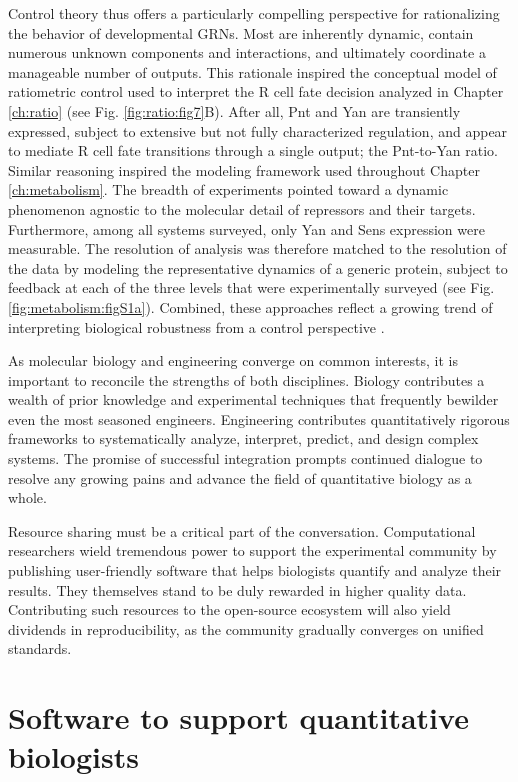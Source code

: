 Control theory thus offers a particularly compelling perspective for rationalizing the behavior of developmental GRNs. Most are inherently dynamic, contain numerous unknown components and interactions, and ultimately coordinate a manageable number of outputs. This rationale inspired the conceptual model of ratiometric control used to interpret the R cell fate decision analyzed in Chapter \ref{ch:ratio} (see Fig. \ref{fig:ratio:fig7}B). After all, Pnt and Yan are transiently expressed, subject to extensive but not fully characterized regulation, and appear to mediate R cell fate transitions through a single output; the Pnt-to-Yan ratio. Similar reasoning inspired the modeling framework used throughout Chapter \ref{ch:metabolism}. The breadth of experiments pointed toward a dynamic phenomenon agnostic to the molecular detail of repressors and their targets. Furthermore, among all systems surveyed, only Yan and Sens expression were measurable. The resolution of analysis was therefore matched to the resolution of the data by modeling the representative dynamics of a generic protein, subject to feedback at each of the three levels that were experimentally surveyed (see Fig. \ref{fig:metabolism:figS1a}). Combined, these approaches reflect a growing trend of interpreting biological robustness from a control perspective \cite{Khammash2016}. 

As molecular biology and engineering converge on common interests, it is important to reconcile the strengths of both disciplines. Biology contributes a wealth of prior knowledge and experimental techniques that frequently bewilder even the most seasoned engineers. Engineering contributes quantitatively rigorous frameworks to systematically analyze, interpret, predict, and design complex systems. The promise of successful integration prompts continued dialogue to resolve any growing pains and advance the field of quantitative biology as a whole. 

Resource sharing must be a critical part of the conversation. Computational researchers wield tremendous power to support the experimental community by publishing user-friendly software that helps biologists quantify and analyze their results. They themselves stand to be duly rewarded in higher quality data. Contributing such resources to the open-source ecosystem will also yield dividends in reproducibility, as the community gradually converges on unified standards.

\section{Software to support quantitative biologists}
\label{appendix:software}

